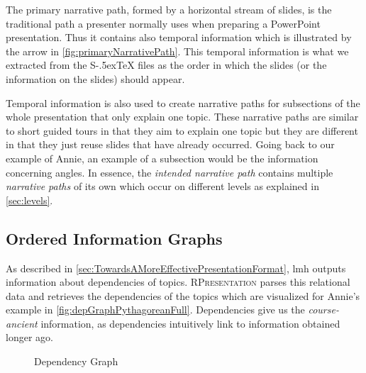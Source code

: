 \documentclass{llncs}
\def\stex{\texorpdfstring{\raisebox{-.5ex}S\kern-.5ex\TeX}{sTeX}\xspace}
\newcommand{\sys}{\textsc{RPresentation}\xspace}
\begin{document}
The primary narrative path, formed by a horizontal stream of slides, is the traditional
path a presenter normally uses when preparing a PowerPoint presentation. Thus it contains
also temporal information which is illustrated by the arrow in
\autoref{fig:primaryNarrativePath}. This temporal information is what we extracted from
the \stex files as the order in which the slides (or the information on the slides) should
appear.

Temporal information is also used to create narrative paths for subsections of the whole presentation that only explain one topic. These narrative paths are similar to short guided tours in that they aim to explain one topic but they are different in that they just reuse slides that have already occurred. Going back to our example of Annie, an example of a subsection would be the information concerning angles. In essence, the \textit{intended narrative path} contains multiple \textit{narrative paths} of its own which occur on different levels as explained in \autoref{sec:levels}.

\subsection{Ordered Information Graphs}
\label{sec:orderedInfoGraphs}

As described in \autoref{sec:TowardsAMoreEffectivePresentationFormat}, lmh outputs information about dependencies of topics. \sys parses this relational data and retrieves the dependencies of the topics which are visualized for Annie's example in \autoref{fig:depGraphPythagoreanFull}. Dependencies give us the \textit{course-ancient} information, as dependencies intuitively link to information obtained longer ago.

\begin{figure}[ht]\vspace{-1em}
  \vspace{-.5em}
  \caption{Dependency Graph}\label{fig:depGraphPythagoreanFull}
\end{figure}
\end{document}
